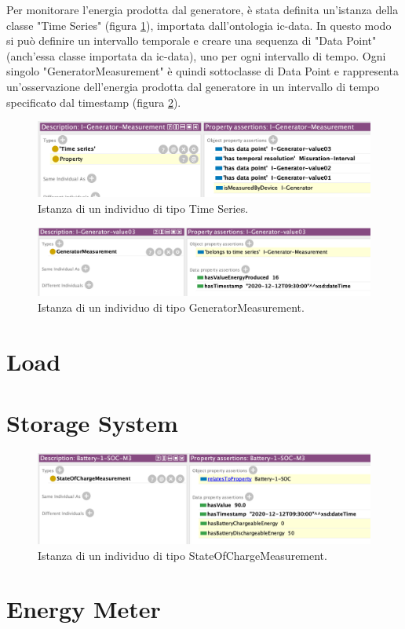 Per monitorare l'energia prodotta dal generatore, è stata definita un'istanza della classe "Time Series" (figura \ref{fig:individual_genmeas}), importata dall'ontologia ic-data. In questo modo si può definire un intervallo temporale e creare una sequenza di "Data Point"(anch'essa classe importata da ic-data), uno per ogni intervallo di tempo. Ogni singolo "GeneratorMeasurement" è quindi sottoclasse di Data Point e rappresenta un'osservazione dell'energia prodotta dal generatore in un intervallo di tempo specificato dal timestamp (figura \ref{fig:individual_genval3}).
\begin{figure}[!ht]
    \centering
    \includegraphics[width=12cm]{images/individual_genmeas.png}
    \caption{Istanza di un individuo di tipo Time Series.}
    \label{fig:individual_genmeas}
\end{figure}
\begin{figure}[!ht]
    \centering
    \includegraphics[width=12cm]{images/individual_genval3.png}
    \caption{Istanza di un individuo di tipo GeneratorMeasurement.}
    \label{fig:individual_genval3}
\end{figure}


\section{Load}

\section{Storage System}

\begin{figure}[!ht]
    \centering
    \includegraphics[width=12cm]{images/individual-batterym3.png}
    \caption{Istanza di un individuo di tipo StateOfChargeMeasurement.}
    \label{fig:individual_batterym3}
\end{figure}

\section{Energy Meter}


